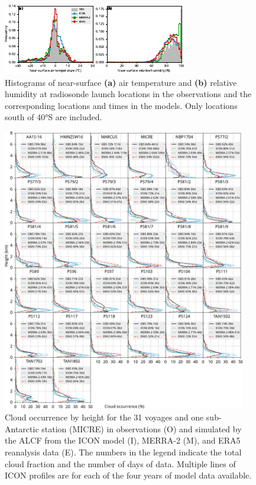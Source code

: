 \documentclass[draft,jgrga]{agutexSI2019}
\begin{document}
\begin{figure}[p!]
\includegraphics[width=\textwidth]{img/stats_hist_surf.pdf}
\caption{
Histograms of near-surface \textbf{(a)} air temperature and \textbf{(b)} relative humidity at radiosonde launch locations in the observations and the corresponding locations and times in the models. Only locations south of 40°S are included.
}
\label{fig:stats-hist-surf}
\end{figure}

\begin{figure}[p!]
\centerline{
\includegraphics[width=0.95\textwidth]{img/cl.pdf}
}
\caption{
Cloud occurrence by height for the 31 voyages and one sub-Antarctic station (MICRE) in observations (O) and simulated by the ALCF from the ICON model (I), MERRA‐2 (M), and ERA5 reanalysis data (E). The numbers in the legend indicate the total cloud fraction and the number of days of data. Multiple lines of ICON profiles are for each of the four years of model data available.
}
\label{fig:cloud-occurrence-panel}
\end{figure}
\end{document}
